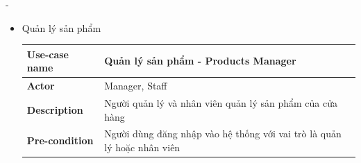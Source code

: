 \begin {list} {-}{}
\begin{itemize}
        \item Quản lý sản phẩm
            \begin{table}[h]
                \begin{tabular}{|l|l|}
                \hline
                \textbf{Use-case name}    & \textbf{Quản lý sản phẩm - Products Manager}                                                                                                                                                                                                                                                                                                                                                                                                                                                                                                                                                                                                                                        \\ \hline
                \textbf{Actor}            & Manager, Staff                                                                                                                                                                                                                                                                                                                                                                                                                                                                                                                                                                                                                                                                      \\ \hline
                \textbf{Description}      & Người quản lý và nhân viên quản lý sản phẩm của cửa hàng                                                                                                                                                                                                                                                                                                                                                                                                                                                                                                                                                                                                                            \\ \hline
                \textbf{Pre-condition}    & Người dùng đăng nhập vào hệ thống với vai trò là quản lý hoặc nhân viên                                                                                                                                                                                                                                                                                                                                                                                                                                                                                                                                                                                                             \\ \hline

\end{tabular}
\end{table}
\end{itemize}
\end{list}
